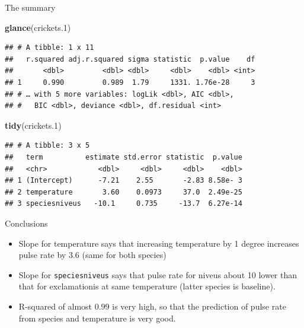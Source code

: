 \documentclass[ignorenonframetext,]{beamer}
\newenvironment{Shaded}{\begin{snugshade}}{\end{snugshade}}
\newcommand{\FloatTok}[1]{\textcolor[rgb]{0.00,0.00,0.81}{#1}}
\newcommand{\KeywordTok}[1]{\textcolor[rgb]{0.13,0.29,0.53}{\textbf{#1}}}
\newcommand{\NormalTok}[1]{#1}
\providecommand{\tightlist}{%
  \setlength{\itemsep}{0pt}\setlength{\parskip}{0pt}}
\begin{document}
\begin{frame}[fragile]{The summary}
\protect\hypertarget{the-summary}{}

\begin{Shaded}
\begin{Highlighting}[]
\KeywordTok{glance}\NormalTok{(crickets}\FloatTok{.1}\NormalTok{)}
\end{Highlighting}
\end{Shaded}

\begin{verbatim}
## # A tibble: 1 x 11
##   r.squared adj.r.squared sigma statistic  p.value    df
##       <dbl>         <dbl> <dbl>     <dbl>    <dbl> <int>
## 1     0.990         0.989  1.79     1331. 1.76e-28     3
## # … with 5 more variables: logLik <dbl>, AIC <dbl>,
## #   BIC <dbl>, deviance <dbl>, df.residual <int>
\end{verbatim}

\begin{Shaded}
\begin{Highlighting}[]
\KeywordTok{tidy}\NormalTok{(crickets}\FloatTok{.1}\NormalTok{)}
\end{Highlighting}
\end{Shaded}

\begin{verbatim}
## # A tibble: 3 x 5
##   term          estimate std.error statistic  p.value
##   <chr>            <dbl>     <dbl>     <dbl>    <dbl>
## 1 (Intercept)      -7.21    2.55       -2.83 8.58e- 3
## 2 temperature       3.60    0.0973     37.0  2.49e-25
## 3 speciesniveus   -10.1     0.735     -13.7  6.27e-14
\end{verbatim}

\end{frame}

\begin{frame}[fragile]{Conclusions}
\protect\hypertarget{conclusions}{}

\begin{itemize}
\tightlist
\item
  Slope for temperature says that increasing temperature by 1 degree
  increases pulse rate by 3.6 (same for both species)
\item
  Slope for \texttt{speciesniveus} says that pulse rate for niveus about
  10 lower than that for exclamationis at same temperature (latter
  species is baseline).
\item
  R-squared of almost 0.99 is very high, so that the prediction of pulse
  rate from species and temperature is very good.
\end{itemize}

\end{frame}
\end{document}
